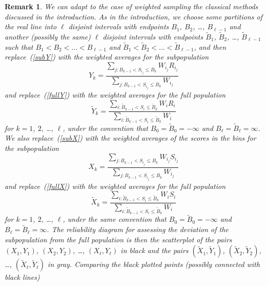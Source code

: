 \documentclass{article}
\newtheorem{remark1}[theorem]{Remark}
\newenvironment{remark}{\begin{remark1} \rm}{\end{remark1}}
\begin{document}
\begin{remark}
\label{weightedremark}
We can adapt to the case of weighted sampling
the classical methods discussed in the introduction.
As in the introduction, we choose some partitions of the real line
into $\ell$ disjoint intervals with endpoints $B_1$, $B_2$, \dots, $B_{\ell-1}$
and another (possibly the same) $\ell$ disjoint intervals
with endpoints $\tilde{B}_1$, $\tilde{B}_2$, \dots, $\tilde{B}_{\ell-1}$
such that $B_1 < B_2 < \dots < B_{\ell-1}$
and $\tilde{B}_1 < \tilde{B}_2 < \dots < \tilde{B}_{\ell-1}$,
and then replace~(\ref{subY}) with the weighted averages for the subpopulation
%
\begin{equation}
\label{subYw}
Y_k = \frac{\sum_{j : B_{k-1} < S_{i_j} \le B_k} W_{i_j} R_{i_j}}
           {\sum_{j : B_{k-1} < S_{i_j} \le B_k} W_{i_j}}
\end{equation}
%
and replace~(\ref{fullY}) with the weighted averages for the full population
%
\begin{equation}
\label{fullYw}
\tilde{Y}_k = \frac{\sum_{i : \tilde{B}_{k-1} < S_i \le \tilde{B}_k} W_i R_i}
                   {\sum_{i : \tilde{B}_{k-1} < S_i \le \tilde{B}_k} W_i}
\end{equation}
%
for $k = 1$, $2$, \dots, $\ell$,
under the convention that $B_0 = \tilde{B}_0 = -\infty$
and $B_{\ell} = \tilde{B}_{\ell} = \infty$.
We also replace~(\ref{subX}) with the weighted averages of the scores
in the bins for the subpopulation
%
\begin{equation}
\label{subXw}
X_k = \frac{\sum_{j : B_{k-1} < S_{i_j} \le B_k} W_{i_j} S_{i_j}}
           {\sum_{j : B_{k-1} < S_{i_j} \le B_k} W_{i_j}}
\end{equation}
%
and replace~(\ref{fullX}) with the weighted averages for the full population
%
\begin{equation}
\label{fullXw}
\tilde{X}_k = \frac{\sum_{i : \tilde{B}_{k-1} < S_i \le \tilde{B}_k} W_i S_i}
                   {\sum_{i : \tilde{B}_{k-1} < S_i \le \tilde{B}_k} W_i}
\end{equation}
%
for $k = 1$, $2$, \dots, $\ell$,
under the same convention that $B_0 = \tilde{B}_0 = -\infty$
and $B_{\ell} = \tilde{B}_{\ell} = \infty$.
The reliability diagram for assessing the deviation of the subpopulation
from the full population is then the scatterplot of the pairs
$(X_1, Y_1)$, $(X_2, Y_2)$, \dots, $(X_{\ell}, Y_{\ell})$ in black
and the pairs $(\tilde{X}_1, \tilde{Y}_1)$, $(\tilde{X}_2, \tilde{Y}_2)$,
\dots, $(\tilde{X}_{\ell}, \tilde{Y}_{\ell})$ in gray.
Comparing the black plotted points (possibly connected with black lines)

\end{remark}
\end{document}
